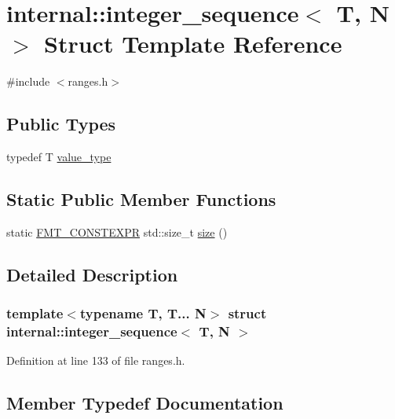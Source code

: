 \hypertarget{structinternal_1_1integer__sequence}{}\section{internal\+:\+:integer\+\_\+sequence$<$ T, N $>$ Struct Template Reference}
\label{structinternal_1_1integer__sequence}


{\ttfamily \#include $<$ranges.\+h$>$}

\subsection*{Public Types}
\begin{DoxyCompactItemize}
\item 
typedef T \hyperlink{structinternal_1_1integer__sequence_a877cd78e25267b5543b8d1be45a8d10a}{value\+\_\+type}
\end{DoxyCompactItemize}
\subsection*{Static Public Member Functions}
\begin{DoxyCompactItemize}
\item 
static \hyperlink{core_8h_a69201cb276383873487bf68b4ef8b4cd}{F\+M\+T\+\_\+\+C\+O\+N\+S\+T\+E\+X\+PR} std\+::size\+\_\+t \hyperlink{structinternal_1_1integer__sequence_a9790e41d81dc6a30550b4a23c30a413d}{size} ()
\end{DoxyCompactItemize}


\subsection{Detailed Description}
\subsubsection*{template$<$typename T, T... N$>$\newline
struct internal\+::integer\+\_\+sequence$<$ T, N $>$}



Definition at line 133 of file ranges.\+h.



\subsection{Member Typedef Documentation}
\mbox{\label{structinternal_1_1integer__sequence_a877cd78e25267b5543b8d1be45a8d10a}} 

